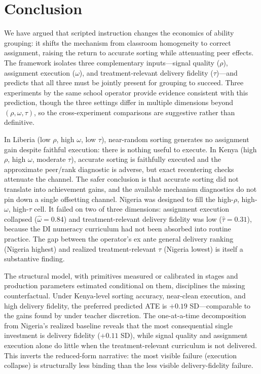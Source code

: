 \documentclass[11pt]{article}
\begin{document}
\section{Conclusion}
\label{sec:conclusion}

We have argued that scripted instruction changes the economics of ability grouping: it shifts the mechanism from classroom homogeneity to correct assignment, raising the return to accurate sorting while attenuating peer effects. The framework isolates three complementary inputs---signal quality ($\rho$), assignment execution ($\omega$), and treatment-relevant delivery fidelity ($\tau$)---and predicts that all three must be jointly present for grouping to succeed. Three experiments by the same school operator provide evidence consistent with this prediction, though the three settings differ in multiple dimensions beyond $(\rho, \omega, \tau)$, so the cross-experiment comparisons are suggestive rather than definitive.

In Liberia (low $\rho$, high $\omega$, low $\tau$), near-random sorting generates no assignment gain despite faithful execution: there is nothing useful to execute. In Kenya (high $\rho$, high $\omega$, moderate $\tau$), accurate sorting is faithfully executed and the approximate peer/rank diagnostic is adverse, but exact recentering checks attenuate the channel. The safer conclusion is that accurate sorting did not translate into achievement gains, and the available mechanism diagnostics do not pin down a single offsetting channel. Nigeria was designed to fill the high-$\rho$, high-$\omega$, high-$\tau$ cell. It failed on two of three dimensions: assignment execution collapsed ($\hat{\omega} = 0.84$) and treatment-relevant delivery fidelity was low ($\hat{\tau} = 0.31$), because the DI numeracy curriculum had not been absorbed into routine practice. The gap between the operator's ex ante general delivery ranking (Nigeria highest) and realized treatment-relevant $\tau$ (Nigeria lowest) is itself a substantive finding.

The structural model, with primitives measured or calibrated in stages and production parameters estimated conditional on them, disciplines the missing counterfactual. Under Kenya-level sorting accuracy, near-clean execution, and high delivery fidelity, the preferred predicted ATE is $+0.19$ SD---comparable to the gains found by \citet{duflo2011peer} under teacher discretion. The one-at-a-time decomposition from Nigeria's realized baseline reveals that the most consequential single investment is delivery fidelity ($+0.11$ SD), while signal quality and assignment execution alone do little when the treatment-relevant curriculum is not delivered. This inverts the reduced-form narrative: the most visible failure (execution collapse) is structurally less binding than the less visible delivery-fidelity failure.
\end{document}
